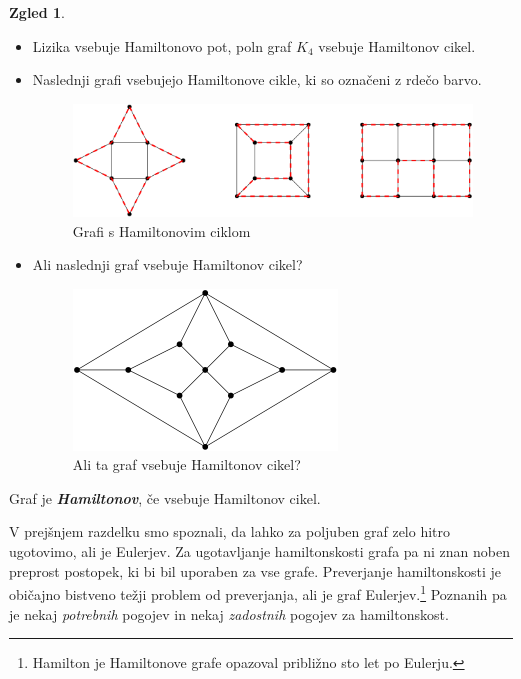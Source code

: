 \documentclass[11pt]{book}
\def\definicija{\color{rdeca}\bf\em}
\theoremstyle{definition}
\theoremstyle{zgled}
\newtheorem*{zgled}{Zgled}
\theoremstyle{odprtproblem}
\theoremstyle{domacanaloga}
\theoremstyle{izrek}
\begin{document}
\begin{zgled}
    \leavevmode
    \begin{itemize}
        \item Lizika vsebuje Hamiltonovo pot, poln graf $K_4$ vsebuje Hamiltonov cikel.
        \item Naslednji grafi vsebujejo Hamiltonove cikle, ki so označeni z rdečo barvo.
        
        \begin{figure}[h]
            \centering
            \includegraphics[width=1\linewidth]{img/grafi-hamilton.png}
            \caption{Grafi s Hamiltonovim ciklom}
        \end{figure}  

        \item Ali naslednji graf vsebuje Hamiltonov cikel?

        \begin{figure}[h]
            \centering
            \includegraphics[width=0.5\linewidth]{img/grafi-hamilton-zgled.png}
            \caption{Ali ta graf vsebuje Hamiltonov cikel?}
        \end{figure}  

    \end{itemize}
\end{zgled}

Graf je {\definicija Hamiltonov}, če vsebuje Hamiltonov cikel. 

V prejšnjem razdelku smo spoznali, da lahko za poljuben graf zelo hitro ugotovimo, ali je Eulerjev. Za ugotavljanje hamiltonskosti grafa pa ni znan noben preprost postopek, ki bi bil uporaben za vse grafe. Preverjanje hamiltonskosti je običajno bistveno težji problem od preverjanja, ali je graf Eulerjev.\footnote{Hamilton je Hamiltonove grafe opazoval približno sto let po Eulerju.} Poznanih pa je nekaj \emph{potrebnih} pogojev in nekaj \emph{zadostnih} pogojev za hamiltonskost. 
\end{document}
